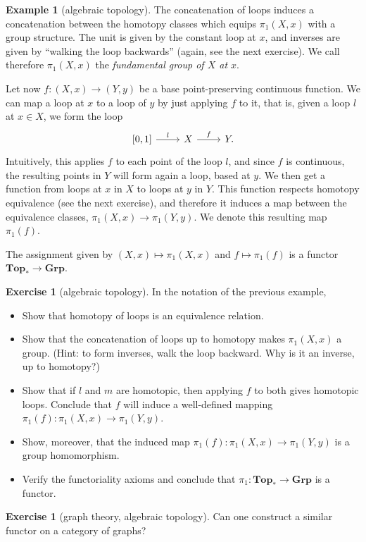 \documentclass[12pt,oneside,headings=small]{scrbook}
\numberwithin{equation}{section}
\theoremstyle{plain}
\theoremstyle{definition}
\newtheorem{eg}[thm]{Example}
\newtheorem{ex}[thm]{Exercise}
\newcommand{\cat}[1]{{\mathbf{#1}}} %
\newcommand{\ar}[2][]{\arrow{#2}{#1}}
\newcommand{\Grp}{\cat{Grp}}
\DeclareMathOperator{\1}{\mathbbm{1}}
\DeclareMathOperator{\2}{\mathbbm{2}}
\let\originalleft\left
\let\originalright\right
\renewcommand{\left}{\mathopen{}\mathclose\bgroup\originalleft}
\renewcommand{\right}{\aftergroup\egroup\originalright}
\begin{document}
\begin{eg}[algebraic topology]
 The concatenation of loops induces a concatenation between the homotopy classes which equips $\pi_1(X,x)$ with a group structure. The unit is given by the constant loop at $x$, and inverses are given by ``walking the loop backwards'' (again, see the next exercise). We call therefore $\pi_1(X,x)$ the \emph{fundamental group of $X$ at $x$}. 
 
 Let now $f:(X,x)\to(Y,y)$ be a base point-preserving continuous function. We can map a loop at $x$ to a loop of $y$ by just applying $f$ to it, that is, given a loop $l$ at $x\in X$, we form the loop
 $$
 \begin{tikzcd}
  \left[0,1\right] \ar{r}{l} & X \ar{r}{f} & Y . 
 \end{tikzcd}
 $$
 Intuitively, this applies $f$ to each point of the loop $l$, and since $f$ is continuous, the resulting points in $Y$ will form again a loop, based at $y$. We then get a function from loops at $x$ in $X$ to loops at $y$ in $Y$. This function respects homotopy equivalence (see the next exercise), and therefore it induces a map between the equivalence classes, $\pi_1(X,x) \to \pi_1(Y,y)$. We denote this resulting map $\pi_1(f)$.
 
 The assignment given by $(X,x)\mapsto \pi_1(X,x)$ and $f\mapsto \pi_1(f)$ is a functor $\cat{Top_*}\to\Grp$.
\end{eg}

\begin{ex}[algebraic topology]
In the notation of the previous example,
\begin{itemize}
 \item Show that homotopy of loops is an equivalence relation.
 \item Show that the concatenation of loops up to homotopy makes $\pi_1(X,x)$ a group. (Hint: to form inverses, walk the loop backward. Why is it an inverse, up to homotopy?)
 \item Show that if $l$ and $m$ are homotopic, then applying $f$ to both gives homotopic loops. Conclude that $f$ will induce a well-defined mapping $\pi_1(f): \pi_1(X,x) \to \pi_1(Y,y)$.
 \item Show, moreover, that the induced map $\pi_1(f): \pi_1(X,x) \to \pi_1(Y,y)$ is a group homomorphism. 
 \item Verify the functoriality axioms and conclude that $\pi_1:\cat{Top_*}\to\Grp$ is a functor.
\end{itemize}
\end{ex}

\begin{ex}[graph theory, algebraic topology]
 Can one construct a similar functor on a category of graphs?
\end{ex}
\end{document}
